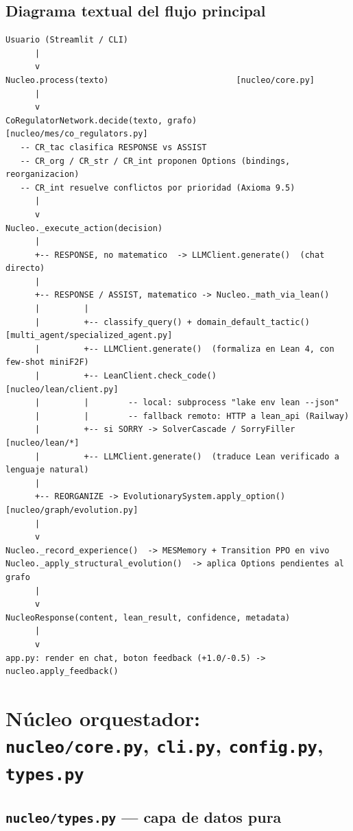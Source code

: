 \documentclass[11pt,a4paper]{report}
\newcommand{\code}[1]{\texttt{#1}}
\begin{document}
\section{Diagrama textual del flujo principal}

\begin{lstlisting}
Usuario (Streamlit / CLI)
      |
      v
Nucleo.process(texto)                          [nucleo/core.py]
      |
      v
CoRegulatorNetwork.decide(texto, grafo)         [nucleo/mes/co_regulators.py]
   -- CR_tac clasifica RESPONSE vs ASSIST
   -- CR_org / CR_str / CR_int proponen Options (bindings, reorganizacion)
   -- CR_int resuelve conflictos por prioridad (Axioma 9.5)
      |
      v
Nucleo._execute_action(decision)
      |
      +-- RESPONSE, no matematico  -> LLMClient.generate()  (chat directo)
      |
      +-- RESPONSE / ASSIST, matematico -> Nucleo._math_via_lean()
      |         |
      |         +-- classify_query() + domain_default_tactic()   [multi_agent/specialized_agent.py]
      |         +-- LLMClient.generate()  (formaliza en Lean 4, con few-shot miniF2F)
      |         +-- LeanClient.check_code()                       [nucleo/lean/client.py]
      |         |        -- local: subprocess "lake env lean --json"
      |         |        -- fallback remoto: HTTP a lean_api (Railway)
      |         +-- si SORRY -> SolverCascade / SorryFiller       [nucleo/lean/*]
      |         +-- LLMClient.generate()  (traduce Lean verificado a lenguaje natural)
      |
      +-- REORGANIZE -> EvolutionarySystem.apply_option()         [nucleo/graph/evolution.py]
      |
      v
Nucleo._record_experience()  -> MESMemory + Transition PPO en vivo
Nucleo._apply_structural_evolution()  -> aplica Options pendientes al grafo
      |
      v
NucleoResponse(content, lean_result, confidence, metadata)
      |
      v
app.py: render en chat, boton feedback (+1.0/-0.5) -> nucleo.apply_feedback()
\end{lstlisting}

\chapter{N\'ucleo orquestador: \code{nucleo/core.py}, \code{cli.py}, \code{config.py}, \code{types.py}}

\section{\code{nucleo/types.py} --- capa de datos pura}
\end{document}

